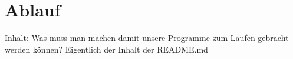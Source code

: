 \chapter{Ablauf}
\label{chap:ablauf}
Inhalt:
Was muss man machen damit unsere Programme zum Laufen gebracht werden können?
Eigentlich der Inhalt der README.md
